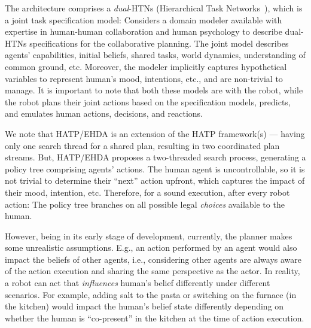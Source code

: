 \documentclass[letterpaper]{article} %
\begin{document}
The architecture comprises a \textit{dual}-HTNs (Hierarchical Task Networks~\cite{naubooks0014222}), which is a joint task specification model: 
Considers a domain modeler available with expertise in human-human collaboration and human psychology to describe dual-HTNs specifications for the collaborative planning. 
The joint model describes agents'  capabilities, initial beliefs, shared tasks, world dynamics, understanding of common ground, etc. Moreover, the modeler implicitly captures hypothetical variables to represent human's mood, intentions, etc., and are non-trivial to manage. It is important to note that both these models are with the robot, while the robot plans their joint actions based on the specification models, predicts, and emulates human actions, decisions, and reactions.    

We note that HATP/EHDA is an extension of the HATP framework(s) --- having only one search thread for a shared plan, resulting in two coordinated plan streams. 
But, HATP/EHDA proposes a two-threaded search process, generating a policy tree comprising agents' actions. 
The human agent is uncontrollable, so it is not trivial to determine their ``next'' action upfront, which captures the impact of their mood, intention, etc.
Therefore, for a sound execution, after every robot action: The policy tree branches on all possible legal \textit{choices} available to the human.

However, being in its early stage of development, currently, the planner makes some unrealistic assumptions. E.g., an action performed by an agent would also impact the beliefs of other agents, i.e., considering other agents are always aware of the action execution and sharing the same perspective as the actor. 
In reality, a robot can act that \textit{influences} human's belief differently under different scenarios. For example, adding salt to the pasta or switching on the furnace (in the kitchen) would impact the human's belief state differently depending on whether the human is ``co-present'' in the kitchen at the time of action execution.   
\end{document}
